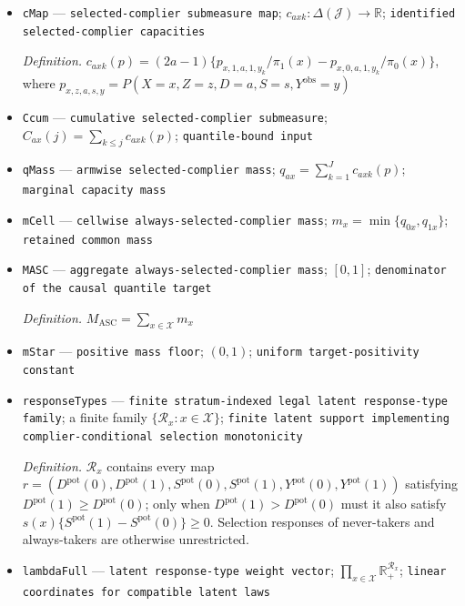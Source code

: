 \documentclass{article}
\begin{document}
\begin{itemize}
  \par\smallskip\noindent\emph{Definition.} \(N_n\sim\operatorname{Multinomial}\{n,p_n(u)\}\)
  \item \texttt{cMap} --- \texttt{selected-\allowbreak{}complier submeasure map}; \(c_{axk}:\Delta(\mathcal J)\to\mathbb R\); \texttt{identified selected-\allowbreak{}complier capacities}
  \par\smallskip\noindent\emph{Definition.} \(c_{axk}(p)=(2a-1)\{p_{x,1,a,1,y_k}/\pi_1(x)-p_{x,0,a,1,y_k}/\pi_0(x)\}\), where \(p_{x,z,a,s,y}=P(X=x,Z=z,D=a,S=s,Y^{\mathrm{obs}}=y)\)
  \item \texttt{Ccum} --- \texttt{cumulative selected-\allowbreak{}complier submeasure}; \(C_{ax}(j)=\sum_{k\le j}c_{axk}(p)\); \texttt{quantile-\allowbreak{}bound input}
  \item \texttt{qMass} --- \texttt{armwise selected-\allowbreak{}complier mass}; \(q_{ax}=\sum_{k=1}^{J}c_{axk}(p)\); \texttt{marginal capacity mass}
  \item \texttt{mCell} --- \texttt{cellwise always-\allowbreak{}selected-\allowbreak{}complier mass}; \(m_x=\min\{q_{0x},q_{1x}\}\); \texttt{retained common mass}
  \item \texttt{MASC} --- \texttt{aggregate always-\allowbreak{}selected-\allowbreak{}complier mass}; \([0,1]\); \texttt{denominator of the causal quantile target}
  \par\smallskip\noindent\emph{Definition.} \(M_{\mathrm{ASC}}=\sum_{x\in\mathcal X}m_x\)
  \item \texttt{mStar} --- \texttt{positive mass floor}; \((0,1)\); \texttt{uniform target-\allowbreak{}positivity constant}
  \item \texttt{responseTypes} --- \texttt{finite stratum-\allowbreak{}indexed legal latent response-\allowbreak{}type family}; a finite family \(\{\mathcal R_x:x\in\mathcal X\}\); \texttt{finite latent support implementing complier-\allowbreak{}conditional selection monotonicity}
  \par\smallskip\noindent\emph{Definition.} \(\mathcal R_x\) contains every map \(r=(D^{\mathrm{pot}}(0),D^{\mathrm{pot}}(1),S^{\mathrm{pot}}(0),S^{\mathrm{pot}}(1),Y^{\mathrm{pot}}(0),Y^{\mathrm{pot}}(1))\) satisfying \(D^{\mathrm{pot}}(1)\ge D^{\mathrm{pot}}(0)\); only when \(D^{\mathrm{pot}}(1)>D^{\mathrm{pot}}(0)\) must it also satisfy \(s(x)\{S^{\mathrm{pot}}(1)-S^{\mathrm{pot}}(0)\}\ge0\). Selection responses of never-takers and always-takers are otherwise unrestricted.
  \item \texttt{lambdaFull} --- \texttt{latent response-\allowbreak{}type weight vector}; \(\prod_{x\in\mathcal X}\mathbb R_{+}^{\mathcal R_x}\); \texttt{linear coordinates for compatible latent laws}

\end{itemize}
\end{document}
